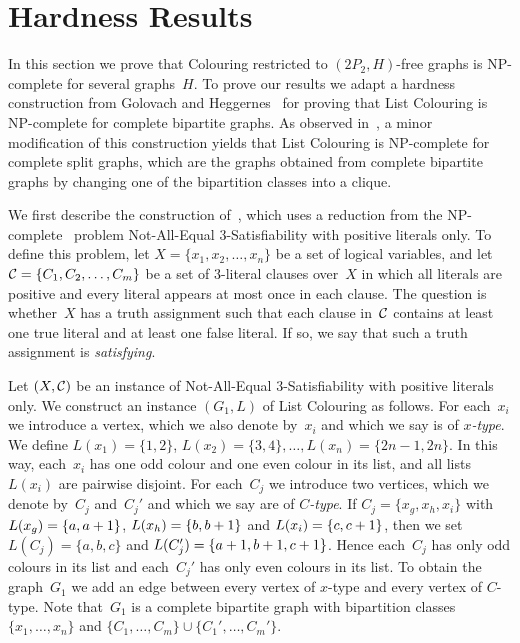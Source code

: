 \documentclass{llncs}
\newcommand{\NP}{{\sf NP}}
\begin{document}
\section{Hardness Results}\label{s-hard}

In this section we prove that {\sc Colouring} restricted to $(2P_2,H)$-free graphs is \NP-complete for several graphs~$H$.
To prove our results we adapt a hardness construction from Golovach and Heggernes~\cite{GH09} for proving that {\sc List Colouring} is \NP-complete for complete bipartite graphs.
As observed in~\cite{GP14}, a minor modification of this construction yields that {\sc List Colouring} is \NP-complete for complete split graphs, which are the graphs obtained from complete bipartite graphs by changing one of the bipartition classes into a clique.

We first describe the construction of~\cite{GH09}, which uses a reduction from the \NP-complete~\cite{Sc78} problem {\sc Not-All-Equal $3$-Satisfiability} with positive literals only.
To define this problem, let $X= \{x_1,x_2,\ldots,x_n\}$ be a set of logical variables, and let ${\cal C} = \{C_1, C_2,\ldots, C_m\}$ be a set of $3$-literal clauses over~$X$ in which all literals are positive and every literal appears at most once in each clause.
The question is whether~$X$ has a truth assignment such that each clause in~${\cal C}$ contains at least one true literal and at least one false literal.
If so, we say that such a truth assignment is {\em satisfying}.

Let $(X,{\cal C})$ be an instance of {\sc Not-All-Equal $3$-Satisfiability} with positive literals only.
We construct an instance $(G_1,L)$ of {\sc List Colouring} as follows.
For each~$x_i$ we introduce a vertex, which we also denote by~$x_i$ and which we say is of {\em $x$-type}.
We define $L(x_1)=\{1,2\}$, $L(x_2)=\{3,4\},\ldots,L(x_n)=\{2n-1,2n\}$.
In this way, each~$x_i$ has one odd colour and one even colour in its list, and all lists~$L(x_i)$ are pairwise disjoint.
For each~$C_j$ we introduce two vertices, which we denote by~$C_j$ and~$C_j'$ and which we say are of {\em $C$-type}.
If $C_j=\{x_g,x_h,x_i\}$ with $L(x_g)=\{a,a+\nobreak 1\}$, $L(x_h)=\{b,b+\nobreak 1\}$ and $L(x_i)=\{c,c+\nobreak 1\}$, then we set $L(C_j)=\{a,b,c\}$ and $L(C_j')=\{a+\nobreak 1,b+\nobreak 1,c+\nobreak 1\}$.
Hence each~$C_j$ has only odd colours in its list and each~$C_j'$ has only even colours in its list.
To obtain the graph~$G_1$ we add an edge between every vertex of $x$-type and every vertex of $C$-type.
Note that~$G_1$ is a complete bipartite graph with bipartition classes $\{x_1,\ldots,x_n\}$ and $\{C_1,\ldots,C_m\}\cup \{C_1',\ldots,C_m'\}$.
\end{document}
